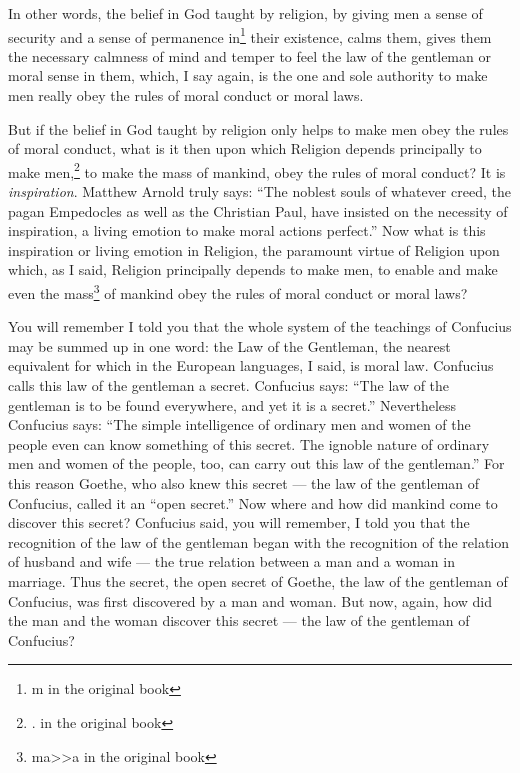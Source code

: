 In other words, the belief in God taught by religion, by giving men a sense of security and a sense of permanence in\footnote{m in the original book} their existence, calms them, gives them the necessary calmness of mind and temper to feel the law of the gentleman or moral sense in them, which, I say again, is the one and sole authority to make men really obey the rules of moral conduct or moral laws.

But if the belief in God taught by religion only helps to make men obey the rules of moral conduct, what is it then upon which Religion depends principally to make men,\footnote{. in the original book} to make the mass of mankind, obey the rules of moral conduct?
It is \emph{inspiration}. Matthew Arnold truly says: ``The  noblest souls of whatever creed, the pagan Empedocles as well as the Christian Paul, have insisted on the necessity of inspiration, a living emotion to make moral actions perfect.''
Now what is this inspiration or living emotion in Religion, the paramount virtue of Religion upon which, as I said, Religion principally depends to make men, to enable and make even the mass\footnote{ma>>a in the original book} of mankind obey the rules of moral conduct or moral laws?

You will remember I told you that the whole system of the teachings of Confucius  may be summed up in one word: the Law of the Gentleman, the nearest equivalent for which in the European languages, I said, is moral law.
Confucius calls this law of the gentleman a secret\cite{num18}.
Confucius says: ``The law of the gentleman is to be found everywhere, and yet it is a secret.''
Nevertheless Confucius says: ``The simple intelligence of ordinary men and women of the people even can know something of this secret. The ignoble nature of ordinary men and women of the people, too, can carry out this law of the gentleman.''
For this reason Goethe, who also knew this secret --- the law of the gentleman of Confucius, called it an ``open secret.''
Now where and how did mankind come to discover this secret?
Confucius said, you will remember, I told you that the recognition of the law of the gentleman began with the recognition of the relation of husband and wife --- the true relation between a man and a woman in marriage.
Thus the secret, the open secret of Goethe, the law of the gentleman of Confucius, was first discovered by a man and woman.
But now, again, how did the man and the woman discover this secret --- the law of the gentleman of Confucius?


